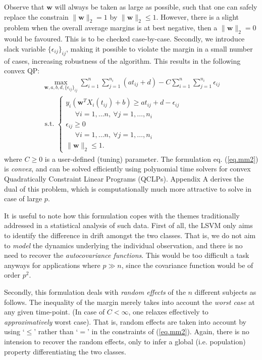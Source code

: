 \documentclass[12pt,a4paper]{article}%
\newcommand{\wv}{\mathbf{w}}
\begin{document}
Observe that $\wv$ will always be taken as large as possible, such that one can safely
replace the constrain $\|\wv\|_2= 1$ by $\|\wv\|_2\leq 1$.
However, there is a slight problem when the overall average margins is at best negative, then
a $\|\wv\|_2=0$ would be favoured. This is to be checked case-by-case.
Secondly, we introduce slack variable
$\{\epsilon_{ij}\}_{ij}$, making it possible to violate the margin in a small number of cases,
increasing robustness of the algorithm.
This results in the following convex QP:
\begin{multline}
	\max_{\wv, a, b,d,\{\epsilon_{ij}\}_{ij}}  \sum_{i=1}^n \sum_{j=1}^{n_i} (at_{ij}+d)
	- C \sum_{i=1}^n \sum_{j=1}^{n_i} \epsilon_{ij}
	\\
	\mbox{ \ s.t. \ }
	\begin{cases}
		y_i(\wv^TX_i(t_{ij})+b) \geq a t_{ij} +d -\epsilon_{ij}& \\
		\ \ \ \ \ \  \forall i=1, \dots n, \ \forall j=1, \dots, n_i \\
		\epsilon_{ij} \geq 0 & \\
		\ \ \ \ \ \  \forall i=1, \dots n, \ \forall j=1, \dots, n_i \\
		\|\wv\|_2\leq 1.
	\end{cases}
	\label{eq.mm2}
\end{multline}
where $C\geq 0$ is a user-defined (tuning) parameter.
The formulation eq. (\ref{eq.mm2}) is {\em convex}, and can be solved efficiently using polynomial time solvers for
convex Quadratically Constraint Linear Programs (QCLPs). Appendix A derives the dual of this problem,
which is computationally much more attractive to solve in case of large $p$.


It is useful to note how this formulation copes with the themes traditionally addressed
in a statistical analysis of such data.
First of all, the LSVM only aims to identify the difference in drift amongst the two classes.
That is, we do not aim to {\em model} the dynamics underlying the individual observation,
and there is no need to recover the {\em autocovariance functions}.
This would be too difficult a task anyways for applications where $p\gg n$,
since the covariance function would be of order $p^2$.

Secondly, this formulation deals with {\em random effects} of the $n$ different subjects as follows.
The inequality of the margin merely takes into account the {\em worst case} at any given time-point.
(In case of $C<\infty$, one relaxes effectively to {\em approximatively} worst case).
That is, random effects are taken into account  by using `$\leq$' rather than `$=$' in the constraints of (\ref{eq.mm2}).
Again, there is no intension to recover the random effects, only to infer a global (i.e. population) property differentiating the two classes.
\end{document}
